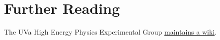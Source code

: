 \chapter{Further Reading}

The UVa High Energy Physics Experimental Group \href{http://faculty.virginia.edu/hep/work}{maintains a wiki}.

